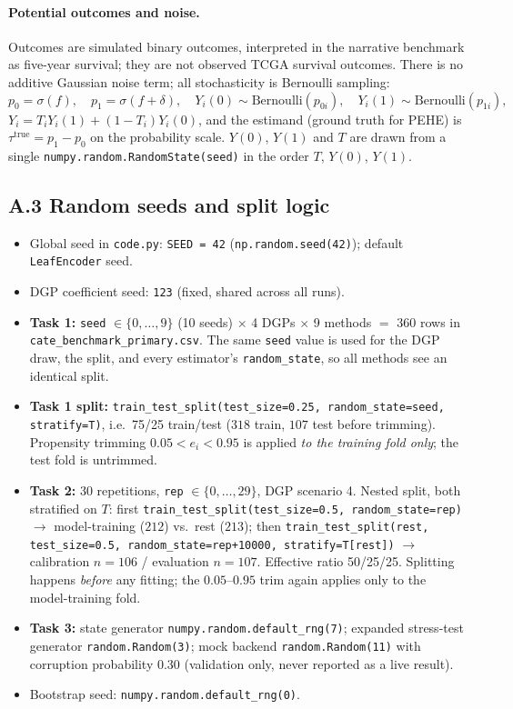 \paragraph{Potential outcomes and noise.}
Outcomes are simulated binary outcomes, interpreted in the narrative benchmark as five-year survival; they are not observed TCGA survival outcomes. There is no additive Gaussian noise term; all stochasticity is Bernoulli sampling:
\[
p_0 = \sigma(f),\quad p_1 = \sigma(f + \delta),\quad
Y_i(0)\sim\mathrm{Bernoulli}(p_{0i}),\quad Y_i(1)\sim\mathrm{Bernoulli}(p_{1i}),
\]
$Y_i = T_i Y_i(1) + (1-T_i)Y_i(0)$, and the estimand (ground truth for PEHE) is
$\tau^{\mathrm{true}} = p_1 - p_0$ on the probability scale. $Y(0)$, $Y(1)$ and
$T$ are drawn from a single \texttt{numpy.random.RandomState(seed)} in the order
$T$, $Y(0)$, $Y(1)$.

\subsection*{A.3 Random seeds and split logic}

\begin{itemize}\tightlist
\item Global seed in \texttt{code.py}: \texttt{SEED = 42} (\texttt{np.random.seed(42)}); default \texttt{LeafEncoder} seed.
\item DGP coefficient seed: \texttt{123} (fixed, shared across all runs).
\item \textbf{Task 1:} \texttt{seed} $\in \{0,\dots,9\}$ (10 seeds) $\times$ 4 DGPs $\times$ 9 methods $=$ 360 rows in \texttt{cate\_benchmark\_primary.csv}. The same \texttt{seed} value is used for the DGP draw, the split, and every estimator's \texttt{random\_state}, so all methods see an identical split.
\item \textbf{Task 1 split:} \texttt{train\_test\_split(test\_size=0.25, random\_state=seed, stratify=T)}, i.e.\ 75/25 train/test ($318$ train, $107$ test before trimming). Propensity trimming $0.05 < e_i < 0.95$ is applied \emph{to the training fold only}; the test fold is untrimmed.
\item \textbf{Task 2:} 30 repetitions, \texttt{rep} $\in \{0,\dots,29\}$, DGP scenario 4. Nested split, both stratified on $T$: first \texttt{train\_test\_split(test\_size=0.5, random\_state=rep)} $\rightarrow$ model-training ($212$) vs.\ rest ($213$); then \texttt{train\_test\_split(rest, test\_size=0.5, random\_state=rep+10000, stratify=T[rest])} $\rightarrow$ calibration $n=106$ / evaluation $n=107$. Effective ratio 50/25/25. Splitting happens \emph{before} any fitting; the $0.05$--$0.95$ trim again applies only to the model-training fold.
\item \textbf{Task 3:} state generator \texttt{numpy.random.default\_rng(7)}; expanded stress-test generator \texttt{random.Random(3)}; mock backend \texttt{random.Random(11)} with corruption probability $0.30$ (validation only, never reported as a live result).
\item Bootstrap seed: \texttt{numpy.random.default\_rng(0)}.
\end{itemize}

